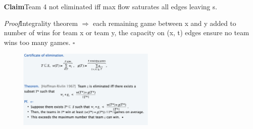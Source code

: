\documentclass[11pt]{article}
\newenvironment{claim}[1]{\par\textbf{Claim}\space#1}{}
\newenvironment{proof}[1]{\par\textit{Proof}\space#1}{\hfill\ensuremath{\square}}
\begin{document}
\begin{claim}
Team 4 not eliminated iff max flow saturates all edges leaving s.
\end{claim}\\

\begin{proof}
Integrality theorem $\Rightarrow $ each remaining game between x and y added to number of wins for team x or team y, the capacity on (x, t) edges ensure no team wins too many games.
\end{proof}

\begin{figure}[H]
		\centering
		\includegraphics[width=0.6\textwidth ]{baseballElimination}
\end{figure}
\end{document}
